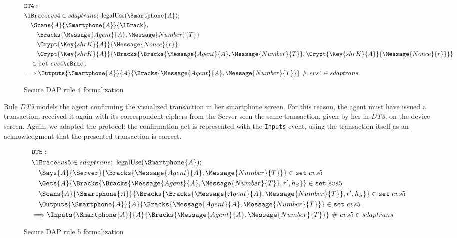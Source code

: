 \begin{figure}[!h]
  \begin{align*}
    & \texttt{DT4}: \newline \\
    & \lBrace evs4 \in sdaptrans;\ \text{legalUse}(\Smartphone{A}); \\
    & \quad \Scans{A}{\Smartphone{A}}{\lBrack}, \\
    & \qquad \Bracks{\Message{Agent}{A}, \Message{Number}{T}} \\
    & \qquad \Crypt{\Key{shrK}{A}}{\Message{Nonce}{r}}, \\
    & \qquad \Crypt{\Key{shrK}{A}}{\Bracks{\Bracks{\Message{Agent}{A}, \Message{Number}{T}}, \Crypt{\Key{shrK}{A}}{\Message{Nonce}{r}}}} \\
    & \quad \in \texttt{set} \ evs4 \rBrace \\
    & \Longrightarrow \Outputs{\Smartphone{A}}{A}{\Bracks{\Message{Agent}{A}, \Message{Number}{T}}} \ \# \ evs4 \in sdaptrans
  \end{align*}
  \label{fig:dap-model-4}
  \caption{Secure DAP rule 4 formalization}
\end{figure}

Rule \textit{DT5} models the agent confirming the visualized transaction in her smartphone screen. For this reason, the agent must have issued a transaction, received it again with its correspondent ciphers from the Server seen the same transaction, given by her in \textit{DT3}, on the device screen. Again, we adapted the protocol: the confirmation act is represented with the \texttt{Inputs} event, using the transaction itself as an acknowledgment that the presented transaction is correct.

\begin{figure}[!h]
  \begin{align*}
    & \texttt{DT5}: \newline \\
    & \lBrace evs5 \in sdaptrans;\ \text{legalUse}(\Smartphone{A}); \\
    & \quad \Says{A}{\Server}{\Bracks{\Message{Agent}{A}, \Message{Number}{T}}} \in \texttt{set} \ evs5 \\
    & \quad \Gets{A}{\Bracks{\Bracks{\Message{Agent}{A}, \Message{Number}{T}}, r', h_S}} \in \texttt{set} \ evs5 \\
    & \quad \Scans{A}{\Smartphone{A}}{\Bracks{\Bracks{\Message{Agent}{A}, \Message{Number}{T}}, r', h_S}} \in \texttt{set} \ evs5 \\
    & \quad \Outputs{\Smartphone{A}}{A}{\Bracks{\Message{Agent}{A}, \Message{Number}{T}}} \in \texttt{set} \ evs5 \\
    & \Longrightarrow \Inputs{\Smartphone{A}}{A}{\Bracks{\Message{Agent}{A}, \Message{Number}{T}}} \ \# \ evs5 \in sdaptrans
  \end{align*}
  \label{fig:dap-model-5}
  \caption{Secure DAP rule 5 formalization}
\end{figure}

